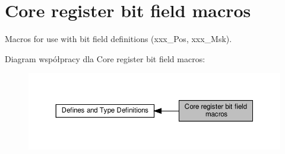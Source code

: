 \hypertarget{group___c_m_s_i_s__core__bitfield}{}\section{Core register bit field macros}
\label{group___c_m_s_i_s__core__bitfield}


Macros for use with bit field definitions (xxx\+\_\+\+Pos, xxx\+\_\+\+Msk).  


Diagram współpracy dla Core register bit field macros\+:\nopagebreak
\begin{figure}[H]
\begin{center}
\leavevmode
\includegraphics[width=350pt]{group___c_m_s_i_s__core__bitfield}
\end{center}
\end{figure}
